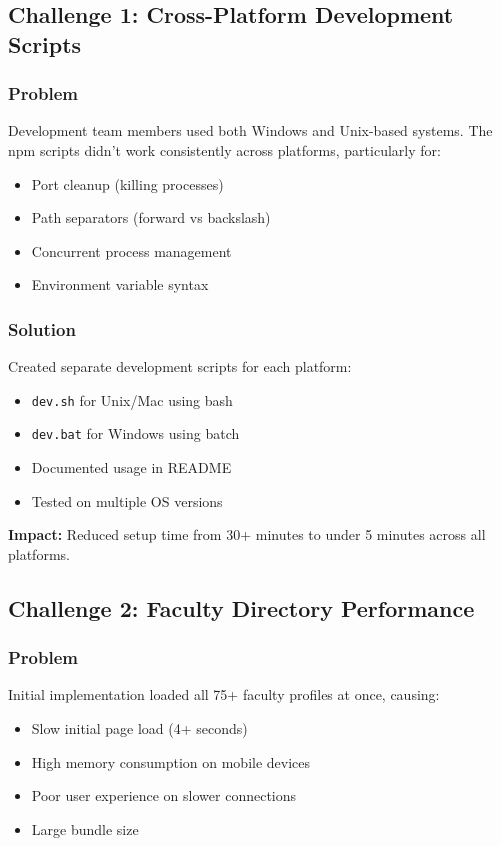 \documentclass[12pt,a4paper]{report}
\begin{document}
\subsection{Challenge 1: Cross-Platform Development Scripts}

\subsubsection*{Problem}
Development team members used both Windows and Unix-based systems. The npm scripts didn't work consistently across platforms, particularly for:
\begin{itemize}
    \item Port cleanup (killing processes)
    \item Path separators (forward vs backslash)
    \item Concurrent process management
    \item Environment variable syntax
\end{itemize}

\subsubsection*{Solution}
Created separate development scripts for each platform:
\begin{itemize}
    \item \texttt{dev.sh} for Unix/Mac using bash
    \item \texttt{dev.bat} for Windows using batch
    \item Documented usage in README
    \item Tested on multiple OS versions
\end{itemize}

\textbf{Impact:} Reduced setup time from 30+ minutes to under 5 minutes across all platforms.

\subsection{Challenge 2: Faculty Directory Performance}

\subsubsection*{Problem}
Initial implementation loaded all 75+ faculty profiles at once, causing:
\begin{itemize}
    \item Slow initial page load (4+ seconds)
    \item High memory consumption on mobile devices
    \item Poor user experience on slower connections
    \item Large bundle size
\end{itemize}
\end{document}

